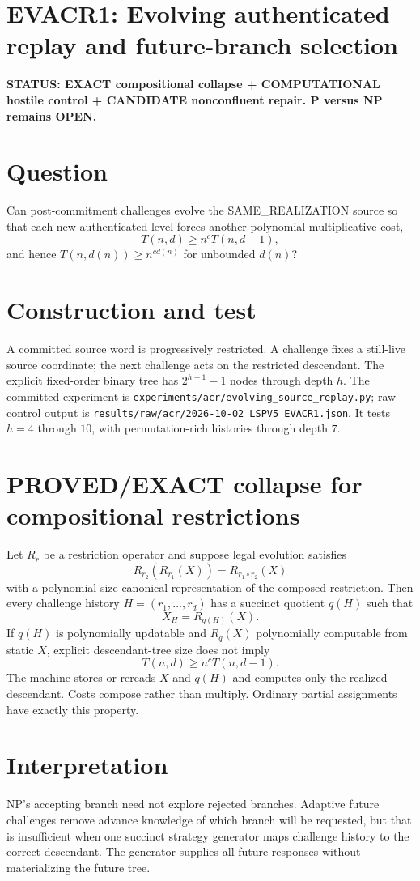 \documentclass[11pt]{article}
\begin{document}
\section*{EVACR1: Evolving authenticated replay and future-branch selection}
\textbf{STATUS: EXACT compositional collapse + COMPUTATIONAL hostile control + CANDIDATE nonconfluent repair. P versus NP remains OPEN.}

\section*{Question}
Can post-commitment challenges evolve the SAME\_REALIZATION source so that each new authenticated level forces another polynomial multiplicative cost,
\[
T(n,d)\ge n^cT(n,d-1),
\]
and hence \(T(n,d(n))\ge n^{cd(n)}\) for unbounded \(d(n)\)?

\section*{Construction and test}
A committed source word is progressively restricted. A challenge fixes a still-live source coordinate; the next challenge acts on the restricted descendant. The explicit fixed-order binary tree has \(2^{h+1}-1\) nodes through depth \(h\). The committed experiment is
\texttt{experiments/acr/evolving\_source\_replay.py}; raw control output is
\texttt{results/raw/acr/2026-10-02\_LSPV5\_EVACR1.json}. It tests \(h=4\) through \(10\), with permutation-rich histories through depth \(7\).

\section*{PROVED/EXACT collapse for compositional restrictions}
Let \(R_r\) be a restriction operator and suppose legal evolution satisfies
\[
R_{r_2}(R_{r_1}(X))=R_{r_1\circ r_2}(X)
\]
with a polynomial-size canonical representation of the composed restriction. Then every challenge history \(H=(r_1,\ldots,r_d)\) has a succinct quotient \(q(H)\) such that
\[
X_H=R_{q(H)}(X).
\]
If \(q(H)\) is polynomially updatable and \(R_q(X)\) polynomially computable from static \(X\), explicit descendant-tree size does not imply
\[
T(n,d)\ge n^cT(n,d-1).
\]
The machine stores or rereads \(X\) and \(q(H)\) and computes only the realized descendant. Costs compose rather than multiply. Ordinary partial assignments have exactly this property.

\section*{Interpretation}
NP's accepting branch need not explore rejected branches. Adaptive future challenges remove advance knowledge of which branch will be requested, but that is insufficient when one succinct strategy generator maps challenge history to the correct descendant. The generator supplies all future responses without materializing the future tree.
\end{document}
